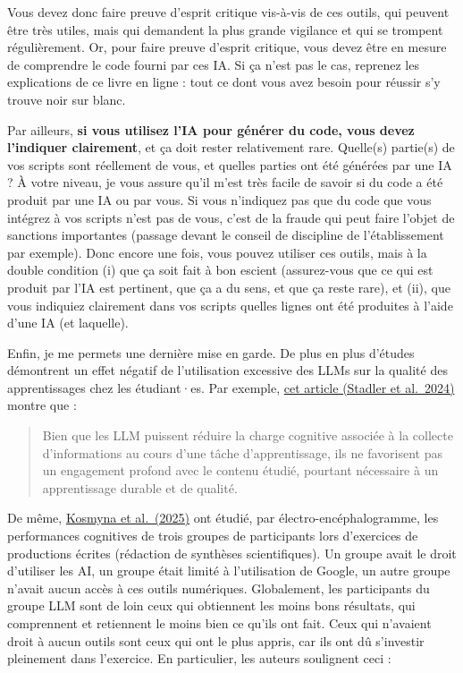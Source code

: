 \documentclass[
  a4paper,
  DIV=11,
  numbers=noendperiod,
  oneside]{scrreprt}
\begin{document}
Vous devez donc faire preuve d'esprit critique vis-à-vis de ces outils,
qui peuvent être très utiles, mais qui demandent la plus grande
vigilance et qui se trompent régulièrement. Or, pour faire preuve
d'esprit critique, vous devez être en mesure de comprendre le code
fourni par ces IA. Si ça n'est pas le cas, reprenez les explications de
ce livre en ligne : tout ce dont vous avez besoin pour réussir s'y
trouve noir sur blanc.

Par ailleurs, \textbf{si vous utilisez l'IA pour générer du code, vous
devez l'indiquer clairement}, et ça doit rester relativement rare.
Quelle(s) partie(s) de vos scripts sont réellement de vous, et quelles
parties ont été générées par une IA ? À votre niveau, je vous assure
qu'il m'est très facile de savoir si du code a été produit par une IA ou
par vous. Si vous n'indiquez pas que du code que vous intégrez à vos
scripts n'est pas de vous, c'est de la fraude qui peut faire l'objet de
sanctions importantes (passage devant le conseil de discipline de
l'établissement par exemple). Donc encore une fois, vous pouvez utiliser
ces outils, mais à la double condition (i) que ça soit fait à bon
escient (assurez-vous que ce qui est produit par l'IA est pertinent, que
ça a du sens, et que ça reste rare), et (ii), que vous indiquiez
clairement dans vos scripts quelles lignes ont été produites à l'aide
d'une IA (et laquelle).

Enfin, je me permets une dernière mise en garde. De plus en plus
d'études démontrent un effet négatif de l'utilisation excessive des LLMs
sur la qualité des apprentissages chez les étudiant·es. Par exemple,
\href{https://www.sciencedirect.com/science/article/pii/S0747563224002541}{cet
article (Stadler et al.~2024)} montre que :

\begin{quote}
Bien que les LLM puissent réduire la charge cognitive associée à la
collecte d'informations au cours d'une tâche d'apprentissage, ils ne
favorisent pas un engagement profond avec le contenu étudié, pourtant
nécessaire à un apprentissage durable et de qualité.
\end{quote}

De même, \href{https://arxiv.org/abs/2506.08872}{Kosmyna et al.~(2025)}
ont étudié, par électro-encéphalogramme, les performances cognitives de
trois groupes de participants lors d'exercices de productions écrites
(rédaction de synthèses scientifiques). Un groupe avait le droit
d'utiliser les AI, un groupe était limité à l'utilisation de Google, un
autre groupe n'avait aucun accès à ces outils numériques. Globalement,
les participants du groupe LLM sont de loin ceux qui obtiennent les
moins bons résultats, qui comprennent et retiennent le moins bien ce
qu'ils ont fait. Ceux qui n'avaient droit à aucun outils sont ceux qui
ont le plus appris, car ils ont dû s'investir pleinement dans
l'exercice. En particulier, les auteurs soulignent ceci :
\end{document}
